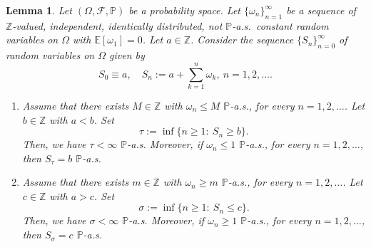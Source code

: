 \documentclass{amsart}
\newcommand{\Z}{\mathbb{Z}}
\newcommand{\cF}{\mathcal{F}}
\newtheorem{lem}[thm]{Lemma}
\theoremstyle{definition}
\theoremstyle{remark}
\begin{document}
\begin{lem}
\label{lem:finiteness_hitting_times}
Let $(\Omega,\cF,\mathbb{P})$ be a probability space. Let $\{\omega_n\}^{\infty}_{n=1}$ be a sequence of $\Z$-valued, independent, identically distributed, not $\mathbb{P}$-a.s.~constant random variables on $\Omega$ with $\mathbb{E}[\omega_1]=0$. Let $a\in\Z$. Consider the sequence $\{S_n\}_{n=0}^{\infty}$ of random variables on $\Omega$ given by
\begin{equation*}
	S_0\equiv a,\quad S_n:=a+\sum_{k=1}^{n}\omega_k,~n=1,2,\ldots.
\end{equation*}

\begin{enumerate}
    \item Assume that there exists $M\in\Z$ with $\omega_n\leq M$ $\mathbb{P}$-a.s., for every $n=1,2,\ldots$. Let $b\in\Z$ with $a<b$. Set
    \begin{equation*}
	    \tau:=\inf\{n\geq1:~S_n\geq b\}.
    \end{equation*}
    Then, we have $\tau<\infty$ $\mathbb{P}$-a.s. Moreover, if $\omega_n\leq 1$ $\mathbb{P}$-a.s., for every $n=1,2,\ldots$, then $S_{\tau}=b$ $\mathbb{P}$-a.s.

    \item Assume that there exists $m\in\Z$ with $\omega_n\geq m$ $\mathbb{P}$-a.s., for every $n=1,2,\ldots$. Let $c\in\Z$ with $a>c$. Set
    \begin{equation*}
	    \sigma:=\inf\{n\geq1:~S_n\leq c\}.
    \end{equation*}
    Then, we have $\sigma<\infty$ $\mathbb{P}$-a.s. Moreover, if $\omega_n\geq 1$ $\mathbb{P}$-a.s., for every $n=1,2,\ldots$, then $S_{\sigma}=c$ $\mathbb{P}$-a.s.
\end{enumerate}
\end{lem}
\end{document}
